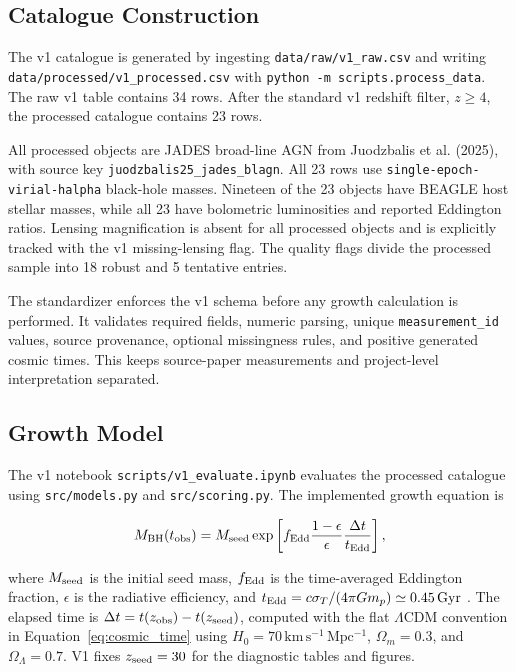 \documentclass[letterpaper,12pt]{article}
\begin{document}
\subsection{Catalogue Construction}

The v1 catalogue is generated by ingesting \texttt{data/raw/v1\_raw.csv} and writing \texttt{data/processed/v1\_processed.csv} with \texttt{python -m scripts.process\_data}. The raw v1 table contains 34 rows. After the standard v1 redshift filter, $z\geq4$, the processed catalogue contains 23 rows.

All processed objects are JADES broad-line AGN from Juodzbalis et al. (2025), with source key \texttt{juodzbalis25\_jades\_blagn}. All 23 rows use \texttt{single-epoch-virial-halpha} black-hole masses. Nineteen of the 23 objects have BEAGLE host stellar masses, while all 23 have bolometric luminosities and reported Eddington ratios. Lensing magnification is absent for all processed objects and is explicitly tracked with the v1 missing-lensing flag. The quality flags divide the processed sample into 18 robust and 5 tentative entries.

The standardizer enforces the v1 schema before any growth calculation is performed. It validates required fields, numeric parsing, unique \texttt{measurement\_id} values, source provenance, optional missingness rules, and positive generated cosmic times. This keeps source-paper measurements and project-level interpretation separated.

\subsection{Growth Model}

The v1 notebook \texttt{scripts/v1\_evaluate.ipynb} evaluates the processed catalogue using \texttt{src/models.py} and \texttt{src/scoring.py}. The implemented growth equation is

\begin{equation}
M_{\rm BH}(t_{\rm obs}) =
M_{\rm seed}
\exp
\left[
f_{\rm Edd}
\frac{1-\epsilon}{\epsilon}
\frac{\Delta t}{t_{\rm Edd}}
\right],
\label{eq:bh_mass_growth}
\end{equation}

where $M_{\rm seed}$ is the initial seed mass, $f_{\rm Edd}$ is the time-averaged Eddington fraction, $\epsilon$ is the radiative efficiency, and $t_{\rm Edd}=c\sigma_T/(4\pi Gm_p)\simeq0.45\,\mathrm{Gyr}$ \cite{Dayal2024}. The elapsed time is $\Delta t=t(z_{\rm obs})-t(z_{\rm seed})$, computed with the flat $\Lambda$CDM convention in Equation~\ref{eq:cosmic_time} using $H_0=70\,\mathrm{km\,s^{-1}\,Mpc^{-1}}$, $\Omega_m=0.3$, and $\Omega_\Lambda=0.7$. V1 fixes $z_{\rm seed}=30$ for the diagnostic tables and figures.
\end{document}
